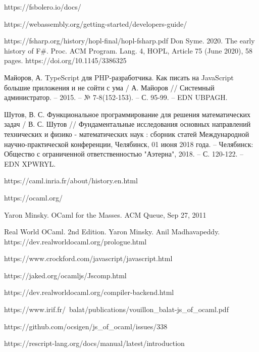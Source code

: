 \begin{thebibliography}{00}
    https://fsbolero.io/docs/ \TODO

    https://webassembly.org/getting-started/developers-guide/ \TODO

    https://fsharp.org/history/hopl-final/hopl-fsharp.pdf 
    Don Syme. 2020. The early history of F\#. Proc. ACM Program. Lang. 4, HOPL, Article 75 (June 2020), 58 pages. https://doi.org/10.1145/3386325
    \TODO

    Майоров, А. TypeScript для PHP-разработчика. Как писать на JavaScript большие приложения и не сойти с ума / 
    А. Майоров // Системный администратор. – 2015. – № 7-8(152-153). – С. 95-99. – EDN UBPAGH.

    Шутов, В. С. Функциональное программирование для решения математических задач 
    / В. С. Шутов // Фундаментальные исследования основных направлений технических и физико - математических наук 
    : сборник статей Международной научно-практической конференции, Челябинск, 01 июня 2018 года. 
    – Челябинск: Общество с ограниченной ответственностью "Аэтерна", 2018. – С. 120-122. – EDN XPWRYL.

    https://caml.inria.fr/about/history.en.html \TODO

    https://ocaml.org/ \TODO

    Yaron Minsky. OCaml for the Masses. ACM Queue, Sep 27, 2011 \TODO

    Real World OCaml. 2nd Edition. Yaron Minsky. Anil Madhavapeddy.
    https://dev.realworldocaml.org/prologue.html \TODO

    https://www.crockford.com/javascript/javascript.html

    https://jaked.org/ocamljs/Jscomp.html \TODO

    https://dev.realworldocaml.org/compiler-backend.html \TODO

    https://www.irif.fr/~balat/publications/vouillon\_balat-js\_of\_ocaml.pdf \TODO

    https://github.com/ocsigen/js\_of\_ocaml/issues/338 \TODO

    https://rescript-lang.org/docs/manual/latest/introduction \TODO


\end{thebibliography}
